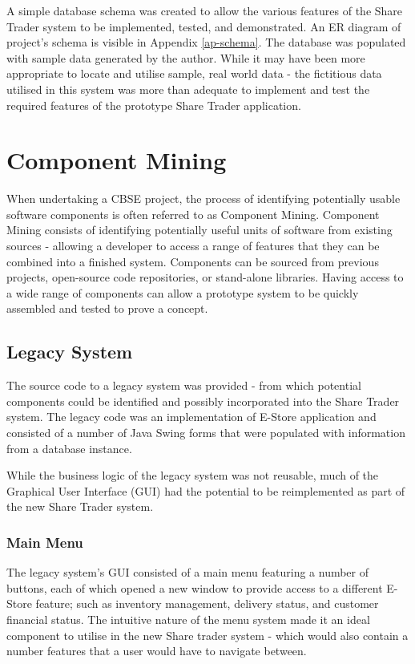 \documentclass[12pt, a4paper,titlepage]{article}
\begin{document}
A simple database schema was created to allow the various features
of the Share Trader system to be implemented, tested, and demonstrated.
An ER diagram of project's schema is visible in Appendix \ref{ap-schema}.
The database was populated with sample data generated by the author. 
While it may have been more appropriate to locate and utilise sample, real world
data - the fictitious data utilised in this system was more than adequate to
implement and test the required features of the  prototype Share Trader
application.


\section{Component Mining}
When undertaking a CBSE project, the process of identifying potentially usable
software components is often referred to as Component Mining.  
Component Mining consists of identifying potentially useful units of software
from existing sources - allowing a developer to access a range of features
that they can be combined into a finished system.
Components can be sourced from previous projects, open-source code
repositories, or stand-alone libraries. 
Having access to a wide range of components can allow a prototype system to be
quickly assembled and tested to prove a concept.

\subsection{Legacy System}
The source code to a legacy system was provided - from which potential
components could be identified and possibly incorporated into the Share Trader
system.  
The legacy code was an implementation of E-Store application and consisted of a
number of Java Swing forms that were populated with information from a
database instance.

While the business logic of the legacy system was not reusable, much of the
Graphical User Interface (GUI) had the potential to be reimplemented as part of
the new Share Trader system.

\subsubsection{Main Menu}
The legacy system’s GUI consisted of a main menu featuring a number of
buttons, each of which opened a new window to provide access to a different
E-Store feature; such as inventory management, delivery status, and customer
financial status.  
The intuitive nature of the menu system made it an ideal component to utilise
in the new Share trader system - which would also contain a number features
that a user would have to navigate between.
\end{document}
